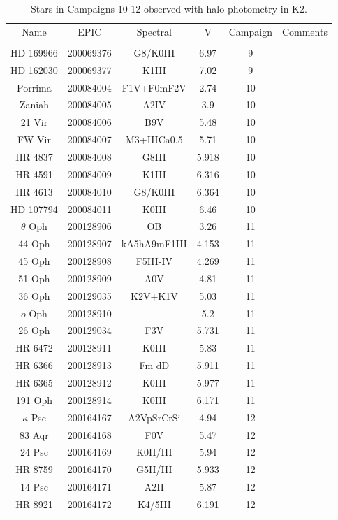 \begin{table*}
\caption{Stars in Campaigns 10-12 observed with halo photometry in K2.\label{table_2}}
\begin{tabular}{cccccc}
\hline \hline
Name & EPIC & Spectral & V & Campaign & Comments \\
 &  &  &  &  &  \\
\hline
HD 169966 & 200069376 & G8/K0III & 6.97 & 9 &  \\
HD 162030 & 200069377 & K1III & 7.02 & 9 &  \\
Porrima & 200084004 & F1V+F0mF2V & 2.74 & 10 &  \\
Zaniah & 200084005 & A2IV & 3.9 & 10 &  \\
21 Vir & 200084006 & B9V & 5.48 & 10 &  \\
FW Vir & 200084007 & M3+IIICa0.5 & 5.71 & 10 &  \\
HR 4837 & 200084008 & G8III & 5.918 & 10 &  \\
HR 4591 & 200084009 & K1III & 6.316 & 10 &  \\
HR 4613 & 200084010 & G8/K0III & 6.364 & 10 &  \\
HD 107794 & 200084011 & K0III & 6.46 & 10 &  \\
$\theta$ Oph & 200128906 & OB & 3.26 & 11 &  \\
44 Oph & 200128907 & kA5hA9mF1III & 4.153 & 11 &  \\
45 Oph & 200128908 & F5III-IV & 4.269 & 11 &  \\
51 Oph & 200128909 & A0V & 4.81 & 11 &  \\
36 Oph & 200129035 & K2V+K1V & 5.03 & 11 &  \\
$o$ Oph & 200128910 &  & 5.2 & 11 &  \\
26 Oph & 200129034 & F3V & 5.731 & 11 &  \\
HR 6472 & 200128911 & K0III & 5.83 & 11 &  \\
HR 6366 & 200128913 & Fm dD & 5.911 & 11 &  \\
HR 6365 & 200128912 & K0III & 5.977 & 11 &  \\
191 Oph & 200128914 & K0III & 6.171 & 11 &  \\
$\kappa$ Psc & 200164167 & A2VpSrCrSi & 4.94 & 12 &  \\
83 Aqr & 200164168 & F0V & 5.47 & 12 &  \\
24 Psc & 200164169 & K0II/III & 5.94 & 12 &  \\
HR 8759 & 200164170 & G5II/III & 5.933 & 12 &  \\
14 Psc & 200164171 & A2II & 5.87 & 12 &  \\
HR 8921 & 200164172 & K4/5III & 6.191 & 12 &  \\
\hline
\end{tabular}
\end{table*}
